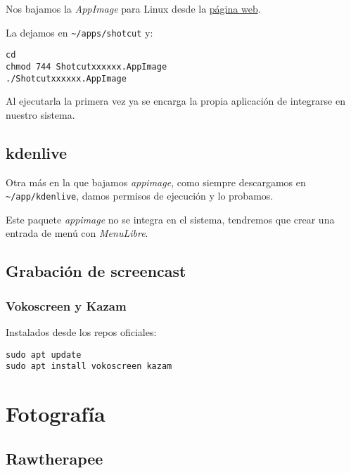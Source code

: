 \documentclass[
  12pt,
  spanish,
]{article}
\begin{document}
Nos bajamos la \emph{AppImage} para Linux desde la
\href{https://www.shotcut.org/}{página web}.

La dejamos en \texttt{\textasciitilde{}/apps/shotcut} y:

\begin{verbatim}
cd
chmod 744 Shotcutxxxxxx.AppImage
./Shotcutxxxxxx.AppImage
\end{verbatim}

Al ejecutarla la primera vez ya se encarga la propia aplicación de
integrarse en nuestro sistema.

\hypertarget{kdenlive}{%
\subsection{kdenlive}\label{kdenlive}}

Otra más en la que bajamos \emph{appimage}, como siempre descargamos en
\texttt{\textasciitilde{}/app/kdenlive}, damos permisos de ejecución y
lo probamos.

Este paquete \emph{appimage} no se integra en el sistema, tendremos que
crear una entrada de menú con \emph{MenuLibre}.

\hypertarget{grabaciuxf3n-de-screencast}{%
\subsection{Grabación de screencast}\label{grabaciuxf3n-de-screencast}}

\hypertarget{vokoscreen-y-kazam}{%
\subsubsection{Vokoscreen y Kazam}\label{vokoscreen-y-kazam}}

Instalados desde los repos oficiales:

\begin{verbatim}
sudo apt update
sudo apt install vokoscreen kazam
\end{verbatim}

\hypertarget{fotografuxeda}{%
\section{Fotografía}\label{fotografuxeda}}

\hypertarget{rawtherapee}{%
\subsection{Rawtherapee}\label{rawtherapee}}
\end{document}
